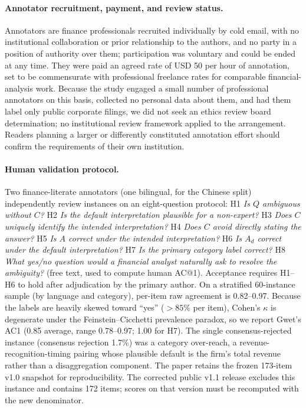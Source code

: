 \paragraph{Annotator recruitment, payment, and review status.}
Annotators are finance professionals recruited individually by cold email, with no
institutional collaboration or prior relationship to the authors, and no party in a position
of authority over them; participation was voluntary and could be ended at any time. They were
paid an agreed rate of USD 50 per hour of annotation, set to be commensurate with professional
freelance rates for comparable financial-analysis work. Because the study engaged a small
number of professional annotators on this basis, collected no personal data about them, and
had them label only public corporate filings, we did not seek an ethics review board
determination; no institutional review framework applied to the arrangement. Readers planning
a larger or differently constituted annotation effort should confirm the requirements of their
own institution.

\paragraph{Human validation protocol.}
Two finance-literate annotators (one bilingual, for the Chinese split) independently review
instances on an eight-question protocol: H1 \emph{Is $Q$ ambiguous without $C$?} H2 \emph{Is the
default interpretation plausible for a non-expert?} H3 \emph{Does $C$ uniquely identify the intended
interpretation?} H4 \emph{Does $C$ avoid directly stating the answer?} H5 \emph{Is $A$ correct under
the intended interpretation?} H6 \emph{Is $A_d$ correct under the default interpretation?} H7
\emph{Is the primary category label correct?} H8 \emph{What yes/no question would a financial analyst
naturally ask to resolve the ambiguity?} (free text, used to compute human AC@1). Acceptance
requires H1--H6 to hold after adjudication by the primary author. On a stratified 60-instance sample
(by language and category), per-item raw agreement is 0.82--0.97. Because the labels are heavily
skewed toward ``yes'' ($>85\%$ per item), Cohen's $\kappa$ is degenerate under the
Feinstein--Cicchetti prevalence paradox, so we report Gwet's AC1 (0.85 average, range
0.78--0.97; 1.00 for H7). The single consensus-rejected instance (consensus rejection
1.7\%) was a category over-reach, a revenue-recognition-timing pairing whose plausible default is
the firm's total revenue rather than a disaggregation component. The paper retains the frozen 173-item v1.0 snapshot for reproducibility. The corrected public v1.1 release excludes this instance and contains 172 items; scores on that version must be recomputed with the new denominator.

